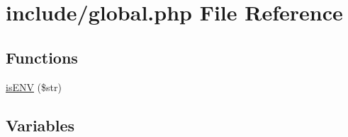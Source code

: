 \hypertarget{global_8php}{\section{include/global.php File Reference}
\label{global_8php}
}
\subsection*{Functions}
\begin{DoxyCompactItemize}
\item 
\hyperlink{global_8php_aa708b5658547eba853300c5c0f5b97b9}{is\-E\-N\-V} (\$str)
\end{DoxyCompactItemize}
\subsection*{Variables}
